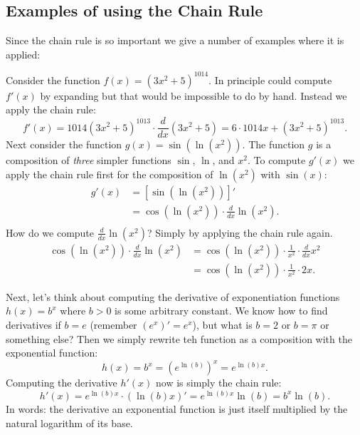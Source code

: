\subsection{Examples of using the Chain Rule}


Since the chain rule is so important we give a number of examples where it is
applied:

\begin{bsp}
Consider the function $f(x) = (3x^2+5)^{1014}$. In principle could compute
$f'(x)$ by expanding but that would be impossible to do by hand. Instead we
apply the chain rule:
\[
f'(x) = 1014(3x^2+5)^{1013} \cdot \frac{d}{dx}(3x^2+5) = 6 \cdot 1014 x + (3x^2+5)^{1013}.
\]
Next consider the function $g(x) = \sin(\ln(x^2))$. The function $g$ is a
composition of \textit{three} simpler functions $\sin$, $\ln$, and $x^2$. To
compute $g'(x)$ we apply the chain rule first for the composition of
$\ln(x^2)$ with $\sin(x)$:
\begin{equation*}
\begin{split}
g'(x) &= [\sin(\ln(x^2))]' \\
&= \cos(\ln(x^2)) \cdot \frac{d}{dx}\ln(x^2). \\
\end{split}
\end{equation*}
How do we compute $\frac{d}{dx}\ln(x^2)$? Simply by applying the chain rule
again.
\begin{equation*}
\begin{split}
\cos(\ln(x^2)) \cdot \frac{d}{dx}\ln(x^2) &= \cos(\ln(x^2)) \cdot \frac{1}{x^2} \cdot \frac{d}{dx}x^2 \\
&= \cos(\ln(x^2)) \cdot \frac{1}{x^2} \cdot 2x.
\end{split}
\end{equation*}
\end{bsp}

\begin{bsp}
Next, let's think about computing the derivative of exponentiation functions 
$h(x) = b^x$ where $b > 0$ is some arbitrary constant. We know how to find
derivatives if $b=e$
(remember $(e^x)' = e^x$), but what is $b=2$ or $b=\pi$ or something else?
Then we simply rewrite teh function as a composition with the exponential
function:
\[
h(x) = b^x = {(e^{\ln(b)})}^x = e^{\ln(b)x}.
\]
Computing the derivative $h'(x)$ now is simply the chain rule:
\[
h'(x) = e^{\ln(b)x} \cdot (\ln(b)x)' = e^{\ln(b)x}\ln(b) = b^x\ln(b).
\]
In words: the derivative an exponential function is just itself multiplied by
the natural logarithm of its base. 
\end{bsp}


